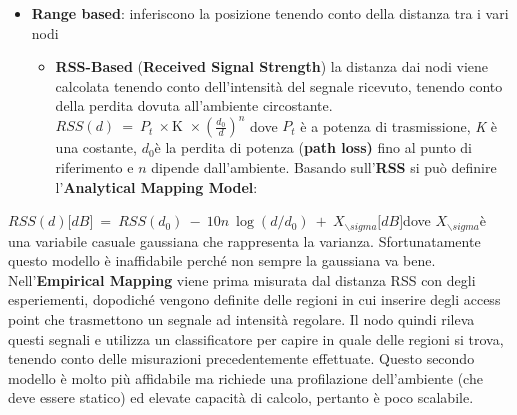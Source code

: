 \begin{itemize}
\item \textbf{Range based}: inferiscono la posizione tenendo conto della
  distanza tra i vari nodi

  \begin{itemize}
  \item \textbf{RSS-Based} (\textbf{Received Signal Strength}) la distanza
    dai nodi viene calcolata tenendo conto dell'intensità del segnale
    ricevuto, tenendo conto della perdita dovuta all'ambiente
    circostante.\(RSS(d)\  = \ P_{t}\  \times \text{K\ } \times
(\frac{d_{0}}{d})^{n}\)
    dove \(P_{t}\) è a potenza di trasmissione, \emph{K} è una costante,
    \(d_{0}\)è la perdita di potenza (\textbf{path loss)} fino al punto
    di riferimento e \(n\) dipende dall'ambiente. Basando
    sull'\textbf{RSS} si può definire l'\textbf{Analytical Mapping
    Model}:

  \end{itemize}
\end{itemize}


\(RSS(d)\lbrack dB\rbrack\  = \ RSS(d_{0})\  - \ 10n\ \log(d/d_{0})\  + \
X_{\backslash sigma}\lbrack dB\rbrack\)dove
\(X_{\backslash sigma}\)è una variabile casuale gaussiana che
rappresenta la varianza. Sfortunatamente questo modello è inaffidabile
perché non sempre la gaussiana va bene. Nell'\textbf{Empirical Mapping}
viene prima misurata dal distanza RSS con degli esperiementi, dopodiché
vengono definite delle regioni in cui inserire degli access point che
trasmettono un segnale ad intensità regolare. Il nodo quindi rileva
questi segnali e utilizza un classificatore per capire in quale delle
regioni si trova, tenendo conto delle misurazioni precedentemente
effettuate. Questo secondo modello è molto più affidabile ma richiede
una profilazione dell'ambiente (che deve essere statico) ed elevate
capacità di calcolo, pertanto è poco scalabile.


